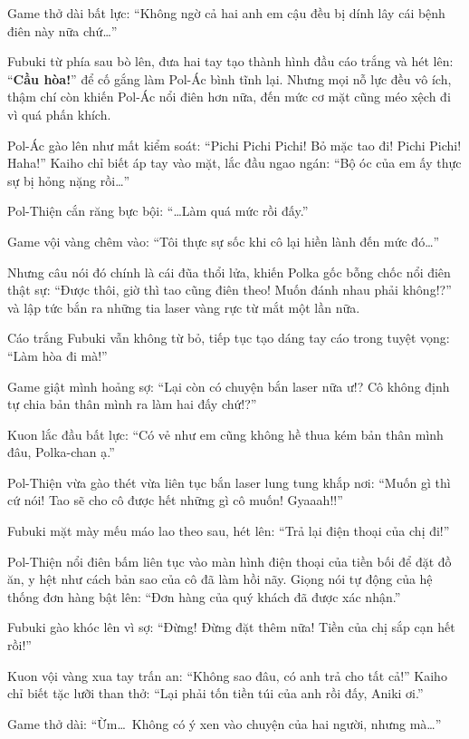 \documentclass[../main.tex]{subfiles}
\begin{document}
Game thở dài bất lực: ``Không ngờ cả hai anh em cậu đều bị dính lây cái bệnh điên này nữa chứ\dots''

Fubuki từ phía sau bò lên, đưa hai tay tạo thành hình đầu cáo trắng và hét lên: ``\textbf{Cầu hòa!}'' để cố gắng làm Pol-Ác bình tĩnh lại. Nhưng mọi nỗ lực đều vô ích, thậm chí còn khiến Pol-Ác nổi điên hơn nữa, đến mức cơ mặt cũng méo xệch đi vì quá phấn khích.

Pol-Ác gào lên như mất kiểm soát: ``Pichi Pichi Pichi! Bỏ mặc tao đi! Pichi Pichi! Haha!'' Kaiho chỉ biết áp tay vào mặt, lắc đầu ngao ngán: ``Bộ óc của em ấy thực sự bị hỏng nặng rồi\dots''

Pol-Thiện cắn răng bực bội: ``\dots Làm quá mức rồi đấy.''

Game vội vàng chêm vào: ``Tôi thực sự sốc khi cô lại hiền lành đến mức đó\dots''

Nhưng câu nói đó chính là cái đũa thổi lửa, khiến Polka gốc bỗng chốc nổi điên thật sự: ``Được thôi, giờ thì tao cũng điên theo! Muốn đánh nhau phải không!?'' và lập tức bắn ra những tia laser vàng rực từ mắt một lần nữa.

Cáo trắng Fubuki vẫn không từ bỏ, tiếp tục tạo dáng tay cáo trong tuyệt vọng: ``Làm hòa đi mà!''

Game giật mình hoảng sợ: ``Lại còn có chuyện bắn laser nữa ư!? Cô không định tự chia bản thân mình ra làm hai đấy chứ!?''

Kuon lắc đầu bất lực: ``Có vẻ như em cũng không hề thua kém bản thân mình đâu, Polka-chan ạ.''

Pol-Thiện vừa gào thét vừa liên tục bắn laser lung tung khắp nơi: ``Muốn gì thì cứ nói! Tao sẽ cho cô được hết những gì cô muốn! Gyaaah!!''


Fubuki mặt mày mếu máo lao theo sau, hét lên: ``Trả lại điện thoại của chị đi!''

Pol-Thiện nổi điên bấm liên tục vào màn hình điện thoại của tiền bối để đặt đồ ăn, y hệt như cách bản sao của cô đã làm hồi nãy. Giọng nói tự động của hệ thống đơn hàng bật lên: ``Đơn hàng của quý khách đã được xác nhận.''

Fubuki gào khóc lên vì sợ: ``Đừng! Đừng đặt thêm nữa! Tiền của chị sắp cạn hết rồi!''

Kuon vội vàng xua tay trấn an: ``Không sao đâu, có anh trả cho tất cả!'' Kaiho chỉ biết tặc lưỡi than thở: ``Lại phải tốn tiền túi của anh rồi đấy, Aniki ơi.''

Game thở dài: ``Ừm\dots\ Không có ý xen vào chuyện của hai người, nhưng mà\dots''
\end{document}

